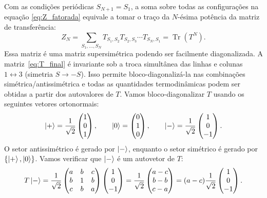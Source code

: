 \documentclass[11pt,a4paper]{article}
\begin{document}
%
Com as condições periódicas \(S_{N+1} = S_1\), a soma sobre todas as configurações na equação \eqref{eq:Z_fatorada} equivale a tomar o traço da \(N\)-ésima potência da matriz de transferência:
%
\begin{equation}
    Z_N = \sum_{S_1, \dots, S_N} T_{S_1,S_2} T_{S_2,S_3} \cdots T_{S_N,S_1}
    = \operatorname{Tr}\left( T^N \right).
    \label{eq:Z_traco}
\end{equation}
%
Essa matriz é uma matriz supersimétrica podendo ser facilmente diagonalizada. A matriz~\eqref{eq:T_final} é invariante sob a troca simultânea das linhas e colunas $1\leftrightarrow3$ (simetria $S\to-S$). Isso permite bloco-diagonalizá-la nas combinações simétrica/antissimétrica e todas as quantidades termodinâmicas podem ser obtidas a partir dos autovalores de \(T\). Vamos bloco-diagonalizar \(T\) usando os seguintes vetores ortonormais:
%
\begin{equation}
    \ket{+} = \frac{1}{\sqrt{2}}
    \begin{pmatrix} 1 \\ 0 \\ 1 \end{pmatrix},
    \qquad
    \ket{0} = 
    \begin{pmatrix} 0 \\ 1 \\ 0 \end{pmatrix},
    \qquad
    \ket{-} = \frac{1}{\sqrt{2}}
    \begin{pmatrix} 1 \\ 0 \\ -1 \end{pmatrix}.
\label{eq:autovetores}    
\end{equation}
%
O setor antissimétrico é gerado por \(\ket{-}\), enquanto o setor simétrico é gerado por \(\{\ket{+}, \ket{0}\}\).
%
Vamos verificar que \(\ket{-}\) é um autovetor de \(T\):
%
\begin{equation}
    T \ket{-}
    =
    \frac{1}{\sqrt{2}}
    \begin{pmatrix}
        a & b & c \\
        b & 1 & b \\
        c & b & a
    \end{pmatrix}
    \begin{pmatrix} 1 \\ 0 \\ -1 \end{pmatrix}
    =
    \frac{1}{\sqrt{2}}
    \begin{pmatrix}
        a - c \\
        b - b \\
        c - a
    \end{pmatrix}
    =
    (a-c)
    \frac{1}{\sqrt{2}}
    \begin{pmatrix} 1 \\ 0 \\ -1 \end{pmatrix}.
\end{equation}
\end{document}
